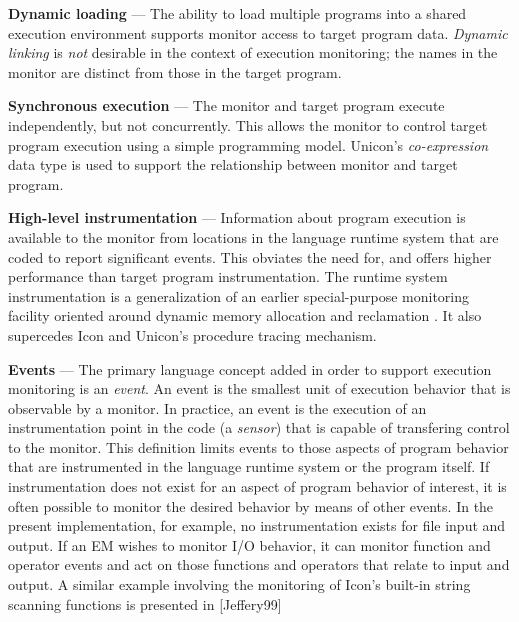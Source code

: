 \begin{list}{}{\itemsep 7pt}
\item [{\bf Dynamic loading}] --- The ability to load multiple programs
	into a shared execution environment supports
	monitor access to target program data.
	{\em Dynamic linking\/} is {\em not\/} desirable in the
	context of execution monitoring; the names in the
	monitor are distinct from those in the target program. 
\item [{\bf Synchronous execution}] --- The monitor and target program execute
	independently, but not concurrently.  This allows the monitor
	to control target program execution using a simple programming model.
	Unicon's {\em co-expression\/} data type is used to support the
	relationship between monitor and target program.
\item [{\bf High-level instrumentation}] --- Information
	about program execution is available to the monitor from
	locations in the language runtime system that are coded to report
	significant events.  This obviates the need for, and
	offers higher performance than target program
	instrumentation.  The runtime system instrumentation is a
	generalization of an earlier special-purpose
	monitoring facility oriented around dynamic memory allocation
	and reclamation \cite{Townsend89}.
	It also supercedes Icon and Unicon's procedure
	tracing mechanism.
\item [{\bf Events}] --- 
	The primary language concept added in order to support execution
	monitoring is an {\em event\/}.  An event is the smallest unit of
	execution behavior that is observable by a monitor.  In practice, an
	event is the execution of an instrumentation point in the code
	(a {\em sensor\/}) 
	that is capable of transfering control to the monitor.
	This definition limits events to those aspects of program behavior
	that are instrumented in the language runtime system or the program
	itself. If instrumentation
	does not exist for an aspect of program behavior of interest, it is
	often possible to monitor the desired behavior by means of other
	events. In the present implementation, for example, no instrumentation
	exists for file input and output.  If an EM wishes to monitor I/O
	behavior, it can monitor function and operator events and act on
	those functions and operators that relate to input and output.
	A similar example involving the monitoring of Icon's built-in
	string scanning functions is presented in [Jeffery99]


\end{list}

